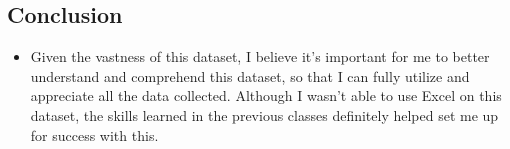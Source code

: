 \documentclass[
  letterpaper,
  DIV=11,
  numbers=noendperiod]{scrreprt}
\providecommand{\tightlist}{%
  \setlength{\itemsep}{0pt}\setlength{\parskip}{0pt}}\usepackage{longtable,booktabs,array}
\begin{document}
\subsection{Conclusion}\label{conclusion}

\begin{itemize}
\tightlist
\item
  Given the vastness of this dataset, I believe it's important for me to
  better understand and comprehend this dataset, so that I can fully
  utilize and appreciate all the data collected. Although I wasn't able
  to use Excel on this dataset, the skills learned in the previous
  classes definitely helped set me up for success with this.
\end{itemize}
\end{document}
